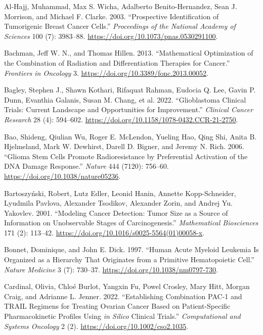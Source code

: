 \documentclass[
  default,
]{sn-jnl}
\newlength{\cslhangindent}
\newenvironment{CSLReferences}[2] %
 {\begin{list}{}{%
  \setlength{\itemindent}{0pt}
  \setlength{\leftmargin}{0pt}
  \setlength{\parsep}{0pt}
  \ifodd #1
   \setlength{\leftmargin}{\cslhangindent}
   \setlength{\itemindent}{-1\cslhangindent}
  \fi
  \setlength{\itemsep}{#2\baselineskip}}}
 {\end{list}}
\begin{document}
\label{refs}
\begin{CSLReferences}{1}{0}
Al-Hajj, Muhammad, Max S. Wicha, Adalberto Benito-Hernandez, Sean J.
Morrison, and Michael F. Clarke. 2003. {``Prospective Identification of
Tumorigenic Breast Cancer Cells.''} \emph{Proceedings of the National
Academy of Sciences} 100 (7): 3983--88.
\url{https://doi.org/10.1073/pnas.0530291100}.

Bachman, Jeff W. N., and Thomas Hillen. 2013. {``Mathematical
Optimization of the Combination of Radiation and Differentiation
Therapies for Cancer.''} \emph{Frontiers in Oncology} 3.
\url{https://doi.org/10.3389/fonc.2013.00052}.

Bagley, Stephen J., Shawn Kothari, Rifaquat Rahman, Eudocia Q. Lee,
Gavin P. Dunn, Evanthia Galanis, Susan M. Chang, et al. 2022.
{``Glioblastoma Clinical Trials: Current Landscape and Opportunities for
Improvement.''} \emph{Clinical Cancer Research} 28 (4): 594--602.
\url{https://doi.org/10.1158/1078-0432.CCR-21-2750}.

Bao, Shideng, Qiulian Wu, Roger E. McLendon, Yueling Hao, Qing Shi,
Anita B. Hjelmeland, Mark W. Dewhirst, Darell D. Bigner, and Jeremy N.
Rich. 2006. {``Glioma Stem Cells Promote Radioresistance by Preferential
Activation of the DNA Damage Response.''} \emph{Nature} 444 (7120):
756--60. \url{https://doi.org/10.1038/nature05236}.

Bartoszyński, Robert, Lutz Edler, Leonid Hanin, Annette Kopp-Schneider,
Lyudmila Pavlova, Alexander Tsodikov, Alexander Zorin, and Andrej Yu.
Yakovlev. 2001. {``Modeling Cancer Detection: Tumor Size as a Source of
Information on Unobservable Stages of Carcinogenesis.''}
\emph{Mathematical Biosciences} 171 (2): 113--42.
\url{https://doi.org/10.1016/s0025-5564(01)00058-x}.

Bonnet, Dominique, and John E. Dick. 1997. {``Human Acute Myeloid
Leukemia Is Organized as a Hierarchy That Originates from a Primitive
Hematopoietic Cell.''} \emph{Nature Medicine} 3 (7): 730--37.
\url{https://doi.org/10.1038/nm0797-730}.

Cardinal, Olivia, Chloé Burlot, Yangxin Fu, Powel Crosley, Mary Hitt,
Morgan Craig, and Adrianne L. Jenner. 2022. {``Establishing Combination
PAC{-}1 and TRAIL Regimens for Treating Ovarian Cancer Based on
Patient{-}Specific Pharmacokinetic Profiles Using {\emph{in Silico}}
Clinical Trials.''} \emph{Computational and Systems Oncology} 2 (2).
\url{https://doi.org/10.1002/cso2.1035}.


\end{CSLReferences}
\end{document}
